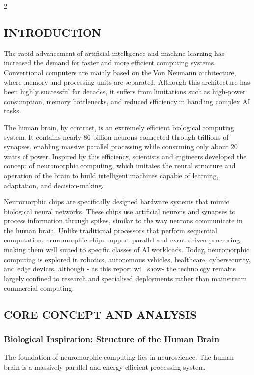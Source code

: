 \begin{multicols}{2}
  \subsection*{\centering\uppercase{INTRODUCTION}}
  The rapid advancement of artificial intelligence and machine learning has increased the demand for faster and more efficient computing systems. Conventional computers are mainly based on the Von Neumann architecture, where memory and processing units are separated. Although this architecture has been highly successful for decades, it suffers from limitations such as high-power consumption, memory bottlenecks, and reduced efficiency in handling complex AI tasks.

  \noindent
  The human brain, by contrast, is an extremely efficient biological computing system. It contains nearly 86 billion neurons connected through trillions of synapses, enabling massive parallel processing while consuming only about 20 watts of power. Inspired by this efficiency, scientists and engineers developed the concept of neuromorphic computing, which imitates the neural structure and operation of the brain to build intelligent machines capable of learning, adaptation, and decision-making.

  \noindent
  Neuromorphic chips are specifically designed hardware systems that mimic biological neural networks. These chips use artificial neurons and synapses to process information through spikes, similar to the way neurons communicate in the human brain. Unlike traditional processors that perform sequential computation, neuromorphic chips support parallel and event-driven processing, making them well suited to specific classes of AI workloads. Today, neuromorphic computing is explored in robotics, autonomous vehicles, healthcare, cybersecurity, and edge devices, although - as this report will show- the technology remains largely confined to research and specialised deployments rather than mainstream commercial computing.

  \subsection*{\uppercase{Core Concept and Analysis}}
  \subsubsection*{Biological Inspiration: Structure of the Human Brain}
  The foundation of neuromorphic computing lies in neuroscience. The human brain is a massively parallel and energy-efficient processing system.


\end{multicols}
